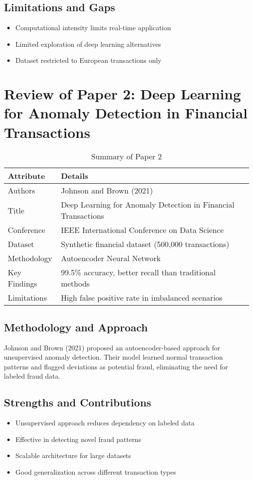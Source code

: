 \subsection*{Limitations and Gaps}
\begin{itemize}
\item Computational intensity limits real-time application
\item Limited exploration of deep learning alternatives
\item Dataset restricted to European transactions only
\end{itemize}

\section{Review of Paper 2: Deep Learning for Anomaly Detection in Financial Transactions}

\begin{table}[h]
\centering
\caption{Summary of Paper 2}
\label{tab:paper2}
\begin{tabular}{ll}
\toprule
\textbf{Attribute} & \textbf{Details} \\
\midrule
Authors & Johnson and Brown (2021) \\
Title & Deep Learning for Anomaly Detection in Financial Transactions \\
Conference & IEEE International Conference on Data Science \\
Dataset & Synthetic financial dataset (500,000 transactions) \\
Methodology & Autoencoder Neural Network \\
Key Findings & 99.5\% accuracy, better recall than traditional methods \\
Limitations & High false positive rate in imbalanced scenarios \\
\bottomrule
\end{tabular}
\end{table}

\subsection*{Methodology and Approach}
Johnson and Brown (2021) proposed an autoencoder-based approach for unsupervised anomaly detection. Their model learned normal transaction patterns and flagged deviations as potential fraud, eliminating the need for labeled fraud data.

\subsection*{Strengths and Contributions}
\begin{itemize}
\item Unsupervised approach reduces dependency on labeled data
\item Effective in detecting novel fraud patterns
\item Scalable architecture for large datasets
\item Good generalization across different transaction types
\end{itemize}

